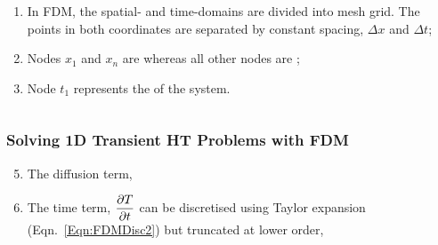 \documentclass[10pt,compress,unknownkeysallowed]{beamer}
\begin{document}
\begin{frame}
\begin{columns}
\begin{column}[l]{0.55\linewidth}
\begin{enumerate}
{                  subjected to prescribed  for $T(x,t)$. }
              \item<2-> In FDM, the spatial- and time-domains are divided into mesh grid. The points in both coordinates are separated by constant spacing, $\Delta x$ and $\Delta t$;
              \item<2-> Nodes $x_{1}$ and $x_{n}$ are  whereas all other nodes are ;
              \item<3-> Node $t_{1}$ represents the  of the system.
           \end{enumerate}
        \end{column}
     \end{columns}
\end{frame}


\begin{frame}
  \frametitle{Solving 1D Transient HT Problems with FDM}
    \begin{enumerate}\setcounter{enumi}{4}
      \item<1-> The diffusion term, 
      \item<3-> The time term, $\displaystyle\frac{\partial T}{\partial t}$ can be discretised using Taylor expansion (Eqn.~\ref{Eqn:FDMDisc2}) but truncated at lower order,
    \end{enumerate}
\end{frame}
\end{document}
